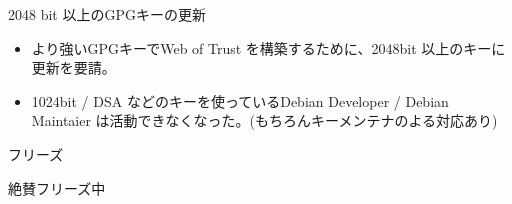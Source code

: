 \begin{frame}{2048 bit 以上のGPGキーの更新}
\begin{itemize}
\item より強いGPGキーでWeb of Trust を構築するために、2048bit
以上のキーに更新を要請。
\item 1024bit / DSA などのキーを使っているDebian Developer / Debian Maintaier
は活動できなくなった。(もちろんキーメンテナのよる対応あり)
\end{itemize}


\end{frame}


\begin{frame}{フリーズ}
\begin{center}
絶賛フリーズ中
\end{center}
\end{frame}
 
